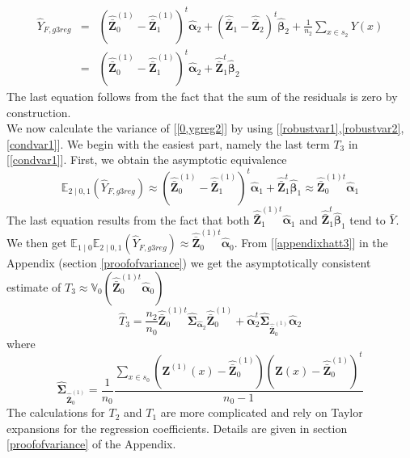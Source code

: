 \documentclass[a4paper,12pt,leqno, titlepage]{article}
\newcommand{\EX}{\mathbb{E}}
\newcommand{\VAR}{\mathbb{V}}
\begin{document}
\begin{eqnarray}\label{0,ygreg2}
\hat{Y}_{F,g3reg}&=&(\hat{\bar{\pmb{Z}}}^{(1)}_0-\hat{\bar{\pmb{Z}}}^{(1)}_1)^t\hat{\pmb{\alpha}}_2 + (\hat{\bar{\pmb{Z}}}_1-\hat{\bar{\pmb{Z}}}_2)^t\hat{\pmb{\beta}}_{2}+\frac{1}{n_2}
\sum_{x\in{s}_2}Y(x) \nonumber \\
&=& (\hat{\bar{\pmb{Z}}}^{(1)}_0-\hat{\bar{\pmb{Z}}}^{(1)}_1)^t\hat{\pmb{\alpha}}_2 +
\hat{\bar{\pmb{Z}}}^t_1\hat{\pmb{\beta}}_{2}
\end{eqnarray}
The last equation follows from the fact that the sum of the residuals is zero by construction.\\
We now calculate the variance of [\ref{0,ygreg2}]  by using [\ref{robustvar1},\ref{robustvar2},\ref{condvar1}]. We begin with the easiest part, namely the last term $T_3$ in [\ref{condvar1}]. First, we obtain the asymptotic equivalence
\begin{equation}\label{equivalenz1}
\EX_{2\mid 0,1}(\hat{Y}_{F,g3reg})\approx ( \hat{\bar{\pmb{Z}}}^{(1)}_0-\hat{\bar{\pmb{Z}}}^{(1)}_1)^t\hat{\pmb{\alpha}}_1 +
\hat{\bar{\pmb{Z}}}^t_1\hat{\pmb{\beta}}_{1}\approx \hat{\bar{\pmb{Z}}}^{(1)t}_0\hat{\pmb{\alpha}}_{1}
\end{equation}
The last equation results from the fact that both $\hat{\bar{\pmb{Z}}}^{(1)t}_1\hat{\pmb{\alpha}}_{1}$ and $
\hat{\bar{\pmb{Z}}}^{t}_1\hat{\pmb{\beta}}_{1}$ tend to $\bar{Y}$.\\
 We then get
$\EX_{1 \mid 0}\EX_{2\mid 0,1}(\hat{Y}_{F,g3reg})\approx \hat{\bar{\pmb{Z}}}^{(1)t}_0\hat{\pmb{\alpha}}_0$.
From [\ref{appendixhatt3}] in the Appendix (section \ref{proofofvariance}) we get the asymptotically consistent estimate of
 $T_3\approx \VAR_0(\hat{\bar{\pmb{Z}}}^{(1)t}_0\hat{\pmb{\alpha}}_0)$
\begin{equation}\label{hatt3}
\hat{T}_3=\frac{n_2}{n_0}\hat{\bar{\pmb{Z}}}_0^{(1)t}\hat{\pmb{\Sigma}}_{\hat{\pmb{\alpha}}_2}\hat{\bar{\pmb{Z}}}_0^{(1)}
+ \hat{\pmb{\alpha}}_2^t\hat{\pmb{\Sigma}}_{\hat{\bar{\pmb{Z}}}^{(1)}_0}\hat{\pmb{\alpha}}_2
\end{equation}
where
\begin{equation}\label{estcovarz}
\hat{\pmb{\Sigma}}_{\hat{\bar{\pmb{Z}}}^{(1)}_{0}}=
\frac{1}{n_{0}}\frac{\sum_{x\in{s_{0}}}(\pmb{Z}^{(1)}(x)-
\hat{\bar{\pmb{Z}}}^{(1)}_{0})(\pmb{Z}(x)-\hat{\bar{\pmb{Z}}}^{(1)}_{0})^t}{n_0-1}
\end{equation}
\noindent The calculations for $T_2$ and $T_1$ are more complicated and rely on Taylor expansions for the regression coefficients. Details are given in section \ref{proofofvariance} of the Appendix.\\
\end{document}
